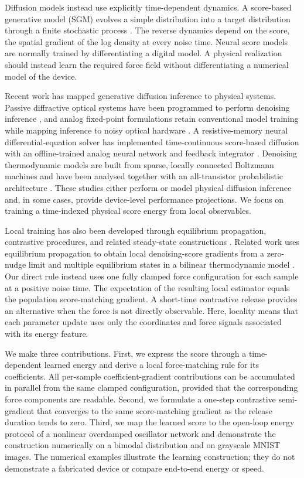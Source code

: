 \documentclass[referee,lineno,pdflatex,sn-nature]{sn-jnl}
\begin{document}
Diffusion models instead use explicitly time-dependent dynamics. A score-based
generative model (SGM) evolves a simple distribution into a target distribution
through a finite stochastic process \cite{song2019generative,
song2021scorebased}. The reverse dynamics depend on the score, the spatial gradient
of the log density at every noise time. Neural score models are normally trained
by differentiating a digital model. A physical realization should instead learn the
required force field without differentiating a numerical model of the device.

Recent work has mapped generative diffusion inference to physical systems. Passive
diffractive optical systems have been programmed to perform denoising inference
\cite{oguz2024optical}, and analog fixed-point formulations retain conventional
model training while mapping inference to noisy optical hardware
\cite{chu2026analog}. A resistive-memory neural differential-equation solver has
implemented time-continuous score-based diffusion with an offline-trained analog
neural network and feedback integrator \cite{yang2026resistive}. Denoising
thermodynamic models are built from sparse, locally
connected Boltzmann machines and have been analysed together with an all-transistor
probabilistic architecture \cite{jelincic2026efficient}. These studies either
perform or model physical diffusion inference and, in some cases, provide device-level
performance projections. We focus on training a time-indexed physical score energy
from local observables.

Local training has also been developed through equilibrium propagation,
contrastive procedures, and related steady-state constructions
\cite{scellier2017equilibrium,stern2021supervised,dillavou2022demonstration}.
Related work uses equilibrium propagation to obtain local denoising-score
gradients from a zero-nudge limit and multiple equilibrium states in a bilinear
thermodynamic model \cite{de2026symmetric}. Our direct rule instead uses one fully
clamped force configuration for each sample at a positive noise time. The
expectation of the resulting local estimator equals the population score-matching
gradient. A short-time contrastive release provides an alternative when the force
is not directly observable.
Here, locality means that each parameter update uses only the coordinates and force
signals associated with its energy feature.

We make three contributions. First, we express the score through a time-dependent
learned energy and derive a local force-matching rule for its coefficients.
All per-sample coefficient-gradient contributions can be accumulated in parallel
from the same clamped configuration, provided that the corresponding force
components are readable.
Second, we formulate a one-step contrastive semi-gradient that converges to the same
score-matching gradient as the release duration tends to zero. Third, we map the
learned score to the open-loop energy protocol of a nonlinear overdamped oscillator
network and demonstrate the construction numerically on a bimodal distribution and
on grayscale MNIST images. The numerical examples illustrate the learning
construction; they do not demonstrate a fabricated device or compare end-to-end
energy or speed.
\end{document}
